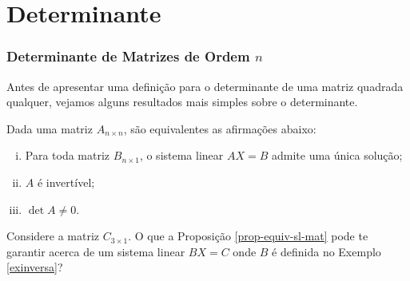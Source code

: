 \section{Determinante}

\begin{frame}
    \frametitle{Determinante de Matrizes de Ordem $n$}

    Antes de apresentar uma definição para o determinante de uma matriz quadrada qualquer, vejamos alguns resultados mais simples sobre o determinante. \pause

    \begin{proposicao}\label{prop-equiv-sl-mat}
        Dada uma matriz $A_{n \times n}$, são equivalentes as afirmações abaixo:
        \begin{enumerate}[i)]
            \item Para toda matriz $B_{n \times 1}$, o sistema linear $AX=B$ admite uma única solução;
            \item $A$ é invertível;
            \item $\det A \neq 0$.
        \end{enumerate}
    \end{proposicao}\pause

 
    
    \begin{exemplo}
        Considere a matriz $C_{3 \times 1}$. O que a  Proposição \ref{prop-equiv-sl-mat} pode te garantir acerca de um sistema linear $BX = C$ onde $B$ é definida no Exemplo \ref{exinversa}?
    \end{exemplo}
\end{frame}


